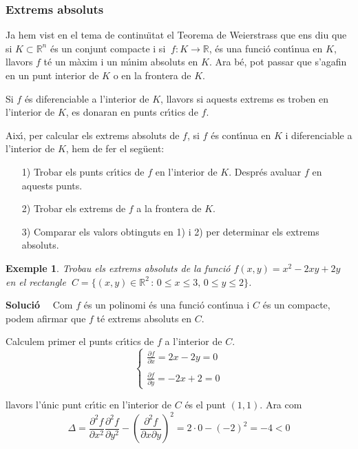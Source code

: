 \documentclass[12pt]{article}
\newcommand{\solucio}{\textbf{Soluci{\'o}}\ \ }
\newtheorem{exemple}{Exemple}[subsection]
\newcommand{\R}{\mathbb{R}}
\begin{document}
\subsubsection{Extrems absoluts}

Ja hem vist en el tema de continu{\"\i}tat el Teorema de Weierstrass que ens diu que si $K\subset
\R ^ n$ {\'e}s un conjunt compacte i si $\ f :K  \longrightarrow \R $,    {\'e}s
una funci{\'o} cont{\'\i}nua en $ K $, llavors $ f $ t{\'e} un m{\`a}xim i un m{\'\i}nim absoluts en $ K$.
Ara b{\'e}, pot passar que s'agafin en un punt interior de $K$ o en la frontera de $K$.

Si $ f $ {\'e}s
diferenciable a l'interior de $ K $, llavors si aquests extrems es troben en l'interior de $K$,
 es donaran en punts cr{\'\i}tics de $ f $.

Aix{\'\i}, per calcular els extrems absoluts de $ f $, si $ f $ {\'e}s
cont{\'\i}nua en $ K $ i diferenciable a l'interior de $ K $, hem de fer el seg{\"u}ent:
\begin{itemize}
\item [1)] Trobar els punts cr{\'\i}tics de
$ f $ en l'interior de $ K $. Despr{\'e}s avaluar $ f $ en aquests punts.
\item [2)] Trobar els extrems de $ f $ a la frontera de $ K $.
\item [3)] Comparar els valors obtinguts en 1) i 2) per
determinar els extrems absoluts.
\end{itemize}

\vspace{0.4cm}
\begin{exemple}\label{extr abs1}
Trobau els extrems absoluts de la funci{\'o} $ f (x, y) = x ^ 2-2 x y +2y $
en el rectangle $\ C = \{(x, y) \in \R ^ 2 \,: \, 0 \leq x \leq 3, \, 0 \leq y
\leq 2 \} $.
\end{exemple}

\solucio
Com $ f $ {\'e}s un polinomi {\'e}s una funci{\'o} cont{\'\i}nua i $ C $ {\'e}s un compacte, podem afirmar que $f$ t{\'e} extrems absoluts en $C$.

Calculem primer el punts cr{\'\i}tics de $ f $ a l'interior de
$ C $.
\[
  \begin{cases}
    \displaystyle\frac{\partial f}{\partial x} = 2x-2y = 0 \\
    \\
       \displaystyle\frac{\partial f}{\partial y} =- 2x +2 = 0
  \end{cases}
\]

llavors l'{\'u}nic punt cr{\'\i}tic en l'interior de $ C $ {\'e}s el punt
$ (1,1) $. Ara com
\[
\Delta = \frac{\partial ^ 2 f}{\partial x ^ 2} \frac{\partial ^ 2
f}{\partial y ^ 2} - \left (\frac{\partial ^ 2 f}{\partial x \partial y}
\right) ^ 2 = 2\cdot 0 - (-2) ^ 2 = -4 <0
\]
\end{document}
